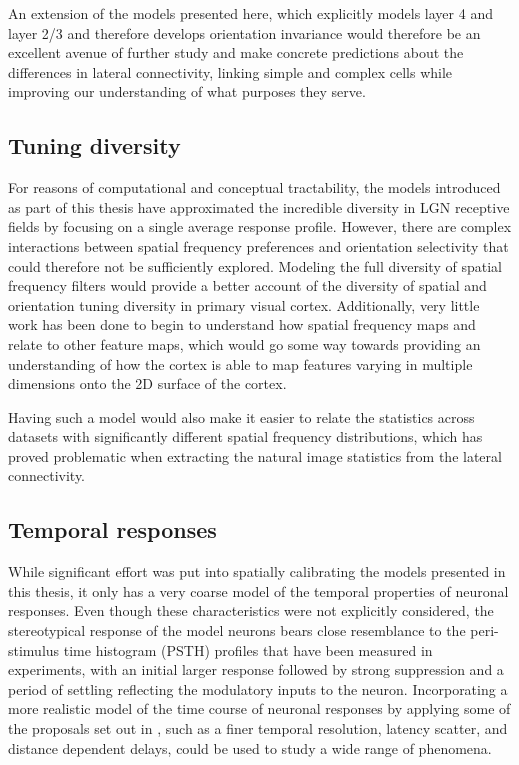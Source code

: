 An extension of the models presented here, which explicitly models
layer 4 and layer 2/3 and therefore develops orientation invariance
would therefore be an excellent avenue of further study and make
concrete predictions about the differences in lateral connectivity,
linking simple and complex cells while improving our understanding of what
purposes they serve.

\subsection{Tuning diversity}

For reasons of computational and conceptual tractability, the models
introduced as part of this thesis have approximated the incredible
diversity in LGN receptive fields by focusing on a single average
response profile. However, there are complex interactions between spatial
frequency preferences and orientation selectivity that could therefore
not be sufficiently explored. Modeling the full diversity of spatial
frequency filters would provide a better account of the diversity of
spatial and orientation tuning diversity in primary visual
cortex. Additionally, very little work has been done to begin to
understand how spatial frequency maps and relate to other feature
maps, which would go some way towards providing an understanding of
how the cortex is able to map features varying in multiple dimensions
onto the 2D surface of the cortex.

Having such a model would also make it easier to relate the statistics
across datasets with significantly different spatial frequency
distributions, which has proved problematic when extracting the
natural image statistics from the lateral connectivity.

\subsection{Temporal responses}

While significant effort was put into spatially calibrating the models
presented in this thesis, it only has a very coarse model of the
temporal properties of neuronal responses. Even though these
characteristics were not explicitly considered, the stereotypical
response of the model neurons bears close resemblance to the
peri-stimulus time histogram (PSTH) profiles that have been measured
in experiments, with an initial larger response followed by strong suppression and a period of
settling reflecting the modulatory inputs to the neuron. Incorporating
a more realistic model of the time course of neuronal responses by
applying some of the proposals set out in \cite{Stevens2016}, such as
a finer temporal resolution, latency scatter, and distance dependent
delays, could be used to study a wide range of phenomena.

